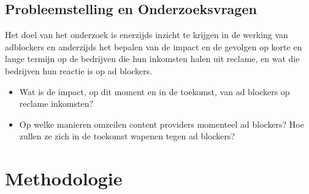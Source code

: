 \documentclass[pdftex,a4paper,12pt,twoside]{report}
\begin{document}


\section{Probleemstelling en Onderzoeksvragen}
\label{sec:onderzoeksvragen}

Het doel van het onderzoek is enerzijds inzicht te krijgen in de werking van adblockers en anderzijds het bepalen van de impact en de gevolgen op korte en lange termijn op de bedrijven die hun inkomsten halen uit reclame, en wat die bedrijven hun reactie is op ad blockers.
\begin{itemize}
	\item Wat is de impact, op dit moment en in de toekomst, van ad blockers op reclame inkomsten? 
	\item Op welke manieren omzeilen content providers momenteel ad blockers? Hoe zullen ze zich in de toekomst wapenen tegen ad blockers?
\end{itemize}



\chapter{Methodologie}
\label{ch:methodologie}

\end{document}
